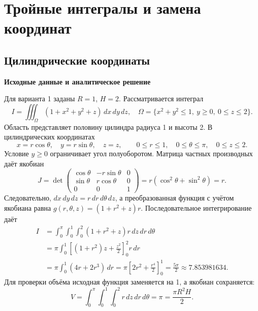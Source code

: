 \documentclass[12pt,a4paper]{article}
\newcommand{\taskhead}[1]{\par\textbf{#1}\par}
\begin{document}
\newpage
\setcounter{section}{1}
\section{Тройные интегралы и замена координат}
\setcounter{subsection}{1}
\subsection{Цилиндрические координаты}
\taskhead{Исходные данные и аналитическое решение}
Для варианта 1 заданы $R=1$, $H=2$. Рассматривается интеграл
\[
I=\iiint_\Omega(1+x^2+y^2+z)\,dx\,dy\,dz,
\quad \Omega=\{x^2+y^2\leq1,\ y\geq0,\ 0\leq z\leq2\}.
\]
Область представляет половину цилиндра радиуса 1 и высоты 2.
В цилиндрических координатах
\[
x=r\cos\theta,\quad y=r\sin\theta,\quad z=z,
\qquad 0\leq r\leq1,\quad0\leq\theta\leq\pi,\quad0\leq z\leq2.
\]
Условие $y\geq0$ ограничивает угол полуоборотом. Матрица частных
производных даёт якобиан
\[
J=\det\begin{pmatrix}
\cos\theta&-r\sin\theta&0\\
\sin\theta&r\cos\theta&0\\0&0&1
\end{pmatrix}=r(\cos^2\theta+\sin^2\theta)=r.
\]
Следовательно, $dx\,dy\,dz=r\,dr\,d\theta\,dz$, а преобразованная
функция с учётом якобиана равна $g(r,\theta,z)=(1+r^2+z)r$.
Последовательное интегрирование даёт
\[
\begin{aligned}
I&=\int_0^\pi\int_0^1\int_0^2(1+r^2+z)r\,dz\,dr\,d\theta\\
&=\pi\int_0^1\left[(1+r^2)z+\frac{z^2}{2}\right]_0^2r\,dr\\
&=\pi\int_0^1(4r+2r^3)\,dr
=\pi\left[2r^2+\frac{r^4}{2}\right]_0^1
=\frac{5\pi}{2}\approx7.853981634.
\end{aligned}
\]
Для проверки объёма исходная функция заменяется на 1, а якобиан сохраняется:
\[
V=\int_0^\pi\int_0^1\int_0^2r\,dz\,dr\,d\theta
=\pi=\frac{\pi R^2H}{2}.
\]
\end{document}
